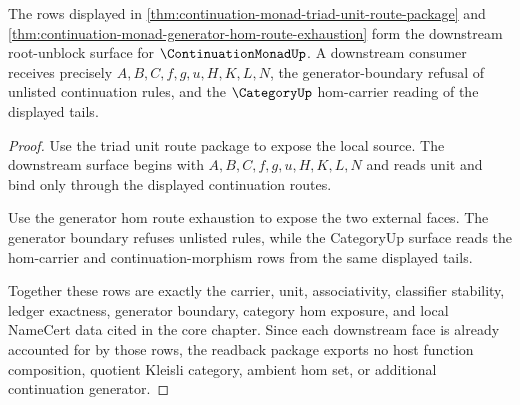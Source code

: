 \begin{theorem}
\label{thm:continuation-monad-root-downstream-readback-package}
The rows displayed in \autoref{thm:continuation-monad-triad-unit-route-package} and \autoref{thm:continuation-monad-generator-hom-route-exhaustion} form the downstream root-unblock surface for $\ContinuationMonadUp$. A downstream consumer receives precisely $A,B,C,f,g,u,H,K,L,N$, the generator-boundary refusal of unlisted continuation rules, and the $\CategoryUp$ hom-carrier reading of the displayed tails.
\end{theorem}
\begin{proof}
Use the triad unit route package to expose the local source. The downstream surface begins with $A,B,C,f,g,u,H,K,L,N$ and reads unit and bind only through the displayed continuation routes.

Use the generator hom route exhaustion to expose the two external faces. The generator boundary refuses unlisted rules, while the CategoryUp surface reads the hom-carrier and continuation-morphism rows from the same displayed tails.

Together these rows are exactly the carrier, unit, associativity, classifier stability, ledger exactness, generator boundary, category hom exposure, and local NameCert data cited in the core chapter. Since each downstream face is already accounted for by those rows, the readback package exports no host function composition, quotient Kleisli category, ambient hom set, or additional continuation generator.
\end{proof}
